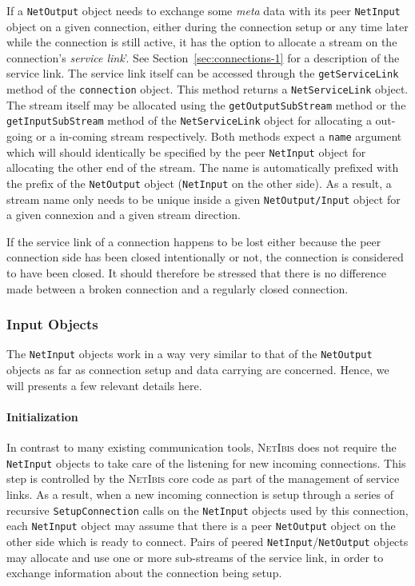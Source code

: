 \documentclass[11pt]{book}
\def\NetIbis{\textsc{NetIbis}\xspace}
\begin{document}
If a \texttt{NetOutput} object needs to exchange some \emph{meta} data
with its peer \texttt{NetInput} object on a given connection, either
during the connection setup or any time later while the connection is
still active, it has the option to allocate a stream on the
connection's \emph{service link}'. See Section~\ref{sec:connections-1}
for a description of the service link. The service link itself can be
accessed through the \texttt{getServiceLink} method of the
\texttt{connection} object. This method returns a
\texttt{NetServiceLink} object. The stream itself may be allocated
using the \texttt{getOutputSubStream} method or the
\texttt{getInputSubStream} method of the \texttt{NetServiceLink}
object for allocating a out-going or a in-coming stream respectively.
Both methods expect a \texttt{name} argument which will should
identically be specified by the peer \texttt{NetInput} object for
allocating the other end of the stream. The name is automatically
prefixed with the prefix of the \texttt{NetOutput} object
(\texttt{NetInput} on the other side). As a result, a stream name only
needs to be unique inside a given \texttt{NetOutput/Input} object for
a given connexion and a given stream direction.

If the service link of a connection happens to be lost either because
the peer connection side has been closed intentionally or not, the
connection is considered to have been closed. It should therefore be
stressed that there is no difference made between a broken connection
and a regularly closed connection.

%
\subsubsection{Input Objects}
\label{sec:input-objects}

The \texttt{NetInput} objects work in a way very similar to that of
the \texttt{NetOutput} objects as far as connection setup and data
carrying are concerned. Hence, we will presents a few relevant details
here.


\paragraph{Initialization}
\label{sec:initialization-1}

In contrast to many existing communication tools, \NetIbis does not
require the \texttt{NetInput} objects to take care of the listening
for new incoming connections. This step is controlled by the \NetIbis
core code as part of the management of service links. As a result,
when a new incoming connection is setup through a series of recursive
\texttt{SetupConnection} calls on the \texttt{NetInput} objects used
by this connection, each \texttt{NetInput} object may assume that
there is a peer \texttt{NetOutput} object on the other side which is
ready to connect. Pairs of peered \texttt{NetInput}/\texttt{NetOutput}
objects may allocate and use one or more sub-streams of the service
link, in order to exchange information about the connection being setup.
\end{document}
